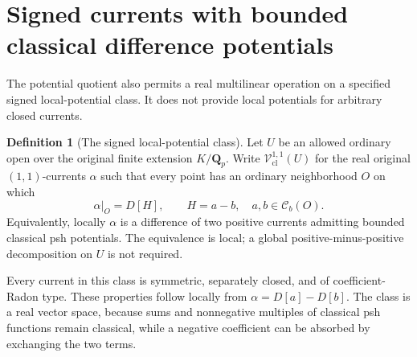 \documentclass[11pt,a4paper]{article}
\numberwithin{equation}{section}
\theoremstyle{definition}
\newtheorem{definition}[theorem]{Definition}
\theoremstyle{remark}
\begin{document}


\section{Signed currents with bounded classical difference potentials}
\label{sec:r5-signed-potential-current-products}

The potential quotient also permits a real multilinear operation
on a specified signed local-potential class.  It does not provide
local potentials for arbitrary closed currents.

\begin{definition}[The signed local-potential class]
\label{def:r5-signed-local-potential-current}
Let $U$ be an allowed ordinary open over the original finite
extension $K/\mathbf Q_p$.  Write
$\mathscr V^{1,1}_{\mathrm{cl}}(U)$ for the real original
$(1,1)$-currents $\alpha$ such that every point has an ordinary
neighborhood $O$ on which
\[
             \alpha|_O=D[H],\qquad
             H=a-b,\quad a,b\in\mathcal C_b(O).
\]
Equivalently, locally $\alpha$ is a difference of two positive
currents admitting bounded classical psh potentials.  The
equivalence is local; a global positive-minus-positive
decomposition on $U$ is not required.
\end{definition}

Every current in this class is symmetric, separately closed,
and of coefficient-Radon type.  These properties follow locally
from $\alpha=D[a]-D[b]$.  The class is a real vector space,
because sums and nonnegative multiples of classical psh
functions remain classical, while a negative coefficient can
be absorbed by exchanging the two terms.
\end{document}
